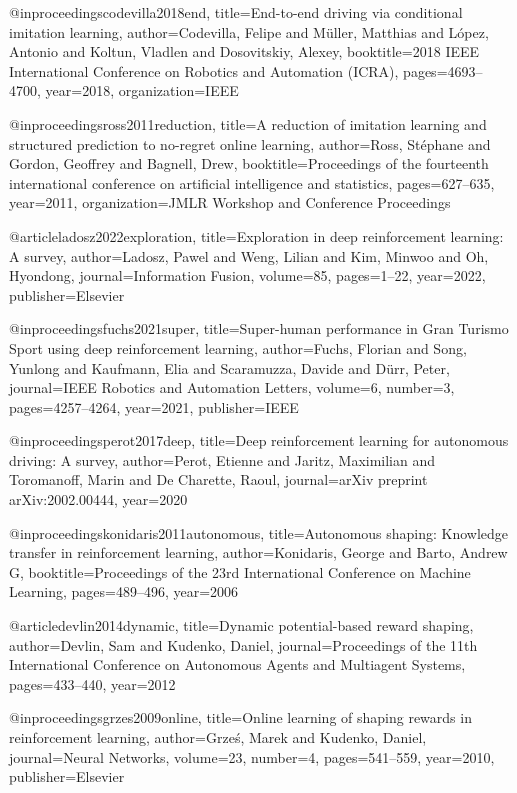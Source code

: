 @inproceedings{codevilla2018end,
  title={End-to-end driving via conditional imitation learning},
  author={Codevilla, Felipe and M{\"u}ller, Matthias and L{\'o}pez, Antonio and Koltun, Vladlen and Dosovitskiy, Alexey},
  booktitle={2018 IEEE International Conference on Robotics and Automation (ICRA)},
  pages={4693--4700},
  year={2018},
  organization={IEEE}
}

@inproceedings{ross2011reduction,
  title={A reduction of imitation learning and structured prediction to no-regret online learning},
  author={Ross, St{\'e}phane and Gordon, Geoffrey and Bagnell, Drew},
  booktitle={Proceedings of the fourteenth international conference on artificial intelligence and statistics},
  pages={627--635},
  year={2011},
  organization={JMLR Workshop and Conference Proceedings}
}

@article{ladosz2022exploration,
  title={Exploration in deep reinforcement learning: A survey},
  author={Ladosz, Pawel and Weng, Lilian and Kim, Minwoo and Oh, Hyondong},
  journal={Information Fusion},
  volume={85},
  pages={1--22},
  year={2022},
  publisher={Elsevier}
}

@inproceedings{fuchs2021super,
  title={Super-human performance in Gran Turismo Sport using deep reinforcement learning},
  author={Fuchs, Florian and Song, Yunlong and Kaufmann, Elia and Scaramuzza, Davide and D{\"u}rr, Peter},
  journal={IEEE Robotics and Automation Letters},
  volume={6},
  number={3},
  pages={4257--4264},
  year={2021},
  publisher={IEEE}
}

@inproceedings{perot2017deep,
  title={Deep reinforcement learning for autonomous driving: A survey},
  author={Perot, Etienne and Jaritz, Maximilian and Toromanoff, Marin and De Charette, Raoul},
  journal={arXiv preprint arXiv:2002.00444},
  year={2020}
}

@inproceedings{konidaris2011autonomous,
  title={Autonomous shaping: Knowledge transfer in reinforcement learning},
  author={Konidaris, George and Barto, Andrew G},
  booktitle={Proceedings of the 23rd International Conference on Machine Learning},
  pages={489--496},
  year={2006}
}

@article{devlin2014dynamic,
  title={Dynamic potential-based reward shaping},
  author={Devlin, Sam and Kudenko, Daniel},
  journal={Proceedings of the 11th International Conference on Autonomous Agents and Multiagent Systems},
  pages={433--440},
  year={2012}
}

@inproceedings{grzes2009online,
  title={Online learning of shaping rewards in reinforcement learning},
  author={Grze{\'s}, Marek and Kudenko, Daniel},
  journal={Neural Networks},
  volume={23},
  number={4},
  pages={541--559},
  year={2010},
  publisher={Elsevier}
}

